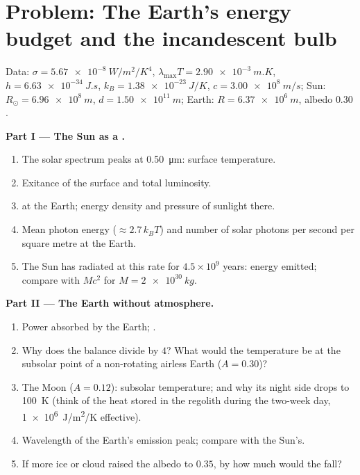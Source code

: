 \section{Problem: The Earth's energy budget and the incandescent bulb}

\begin{problem}\label{pb:b2:thermal-radiation:1}
Data: $\sigma = \qty{5.67e-8}{W/m^2/K^4}$, $\lambda_{\max}T = \qty{2.90e-3}{m.K}$,
$h = \qty{6.63e-34}{J.s}$, $k_B = \qty{1.38e-23}{J/K}$, $c = \qty{3.00e8}{m/s}$;
Sun: $R_\odot = \qty{6.96e8}{m}$, $d = \qty{1.50e11}{m}$; Earth: $R =
\qty{6.37e6}{m}$, albedo $0.30$.

\textbf{Part I --- The Sun as a .}
\begin{enumerate}
  \item The solar spectrum peaks at \qty{0.50}{\micro m}: surface
        temperature.
  \item Exitance of the surface and total luminosity.
  \item {} at the Earth; energy density and pressure of
        sunlight there.
  \item Mean photon energy ($\approx 2.7\,k_BT$) and number of solar
        photons per second per square metre at the Earth.
  \item The Sun has radiated at this rate for $4.5 \times 10^9$ years:
        energy emitted; compare with $Mc^2$ for $M = \qty{2e30}{kg}$.
\end{enumerate}

\textbf{Part II --- The Earth without atmosphere.}
\begin{enumerate}[resume]
  \item Power absorbed by the Earth; .
  \item Why does the balance divide by $4$? What would the
        temperature be at the subsolar point of a non-rotating airless
        Earth ($A = 0.30$)?
  \item The Moon ($A = 0.12$): subsolar temperature; and why its night
        side drops to \qty{100}{K} (think of the heat stored in the
        regolith during the two-week day, \qty{1e6}{J/m^2/K} effective).
  \item Wavelength of the Earth's emission peak; compare with the
        Sun's.
  \item If more ice or cloud raised the albedo to $0.35$, by how much
        would the  fall?
\end{enumerate}


\end{problem}
